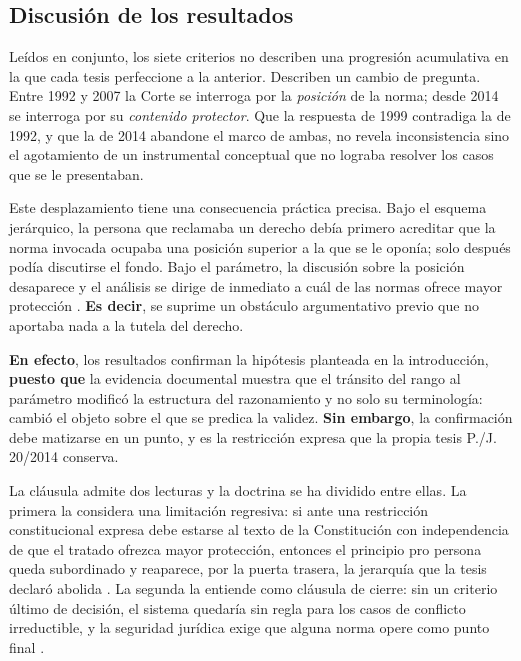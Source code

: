 \documentclass[
  spanish,
  letterpaper, oneside
]{article}
\begin{document}
\subsection{Discusión de los resultados}

Leídos en conjunto, los siete criterios no describen una progresión acumulativa en la que cada tesis perfeccione a la anterior. Describen un cambio de pregunta. Entre 1992 y 2007 la Corte se interroga por la \emph{posición} de la norma; desde 2014 se interroga por su \emph{contenido protector}. Que la respuesta de 1999 contradiga la de 1992, y que la de 2014 abandone el marco de ambas, no revela inconsistencia sino el agotamiento de un instrumental conceptual que no lograba resolver los casos que se le presentaban.

Este desplazamiento tiene una consecuencia práctica precisa. Bajo el esquema jerárquico, la persona que reclamaba un derecho debía primero acreditar que la norma invocada ocupaba una posición superior a la que se le oponía; solo después podía discutirse el fondo. Bajo el parámetro, la discusión sobre la posición desaparece y el análisis se dirige de inmediato a cuál de las normas ofrece mayor protección \citep{scjnIijCT293y2017}. \textbf{Es decir}, se suprime un obstáculo argumentativo previo que no aportaba nada a la tutela del derecho.

\textbf{En efecto}, los resultados confirman la hipótesis planteada en la introducción, \textbf{puesto que} la evidencia documental muestra que el tránsito del rango al parámetro modificó la estructura del razonamiento y no solo su terminología: cambió el objeto sobre el que se predica la validez. \textbf{Sin embargo}, la confirmación debe matizarse en un punto, y es la restricción expresa que la propia tesis P./J. 20/2014 conserva.

La cláusula admite dos lecturas y la doctrina se ha dividido entre ellas. La primera la considera una limitación regresiva: si ante una restricción constitucional expresa debe estarse al texto de la Constitución con independencia de que el tratado ofrezca mayor protección, entonces el principio pro persona queda subordinado y reaparece, por la puerta trasera, la jerarquía que la tesis declaró abolida \citep{alvarezIcazaDerechosMexico}. La segunda la entiende como cláusula de cierre: sin un criterio último de decisión, el sistema quedaría sin regla para los casos de conflicto irreductible, y la seguridad jurídica exige que alguna norma opere como punto final \citep{azuelaGuitronProcesalConstitucional2008}.
\end{document}
